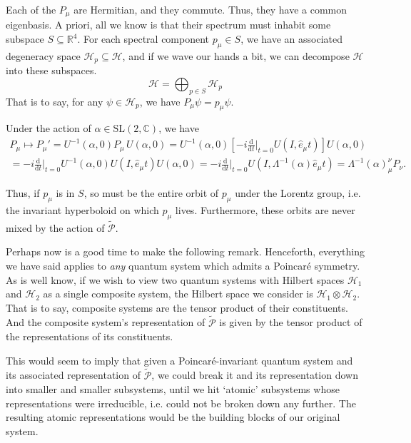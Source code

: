 \documentclass[a4paper,10pt]{scrreprt}
\newcommand{\tder}[2]{\frac{\text{d} #1}{\text{d} #2}}
\newcommand{\R}{\mathbb{R}}
\newcommand{\C}{\mathbb{C}}
\newcommand{\SL}{\mathrm{SL}}
\theoremstyle{definition}
\theoremstyle{plain}
\theoremstyle{remark}
\begin{document}
Each of the $P_{\mu}$ are Hermitian, and they commute. Thus, they have a common eigenbasis. A priori, all we know is that their spectrum must inhabit some subspace $S \subseteq \R^{4}$. For each spectral component $p_{\mu} \in S$, we have an associated degeneracy space $\mathscr{H}_{p} \subseteq \mathscr{H}$, and if we wave our hands a bit, we can decompose $\mathscr{H}$ into these subspaces.
\begin{equation*}
  \mathscr{H} = \bigoplus_{p \in S} \mathscr{H}_{p}
\end{equation*}
That is to say, for any $\psi \in \mathscr{H}_{p}$, we have $P_{\mu}\psi = p_{\mu}\psi$.

Under the action of $\alpha \in \SL(2, \C)$, we have
\begin{multline*}
  P_\mu \mapsto P_{\mu}' = U^{-1}(\alpha,0) P_\mu\, U(\alpha,0) = U^{-1}(\alpha,0)\left[-i\tder{}{t}\biggr|_{t=0} U(I, \hat{e}_\mu t)\right]U(\alpha,0)\\ = -i\tder{}{t}\biggr|_{t=0}U^{-1}(\alpha,0) U(I, \hat{e}_\mu t)U(\alpha,0) = -i\tder{}{t}\biggr|_{t=0}U\left(I,\Lambda^{-1}(\alpha)\hat{e}_\mu t\right) = \Lambda^{-1}(\alpha)^\nu_\mu P_\nu.
\end{multline*}

Thus, if $p_{\mu}$ is in $S$, so must be the entire orbit of $p_{\mu}$ under the Lorentz group, i.e. the invariant hyperboloid on which $p_{\mu}$ lives. Furthermore, these orbits are never mixed by the action of $\widetilde{\mathcal{P}}$.

Perhaps now is a good time to make the following remark. Henceforth, everything we have said applies to \emph{any} quantum system which admits a Poincar{\'e} symmetry. As is well know, if we wish to view two quantum systems with Hilbert spaces $\mathscr{H}_{1}$ and $\mathscr{H}_{2}$ as a single composite system, the Hilbert space we consider is $\mathscr{H}_{1} \otimes \mathscr{H}_{2}$. That is to say, composite systems are the tensor product of their constituents. And the composite system's representation of $\widetilde{\mathcal{P}}$ is given by the tensor product of the representations of its constituents.

This would seem to imply that given a Poincar{\'e}-invariant quantum system and its associated representation of $\widetilde{\mathcal{P}}$, we could break it and its representation down into smaller and smaller subsystems, until we hit `atomic' subsystems whose representations were irreducible, i.e. could not be broken down any further. The resulting atomic representations would be the building blocks of our original system. 
\end{document}
